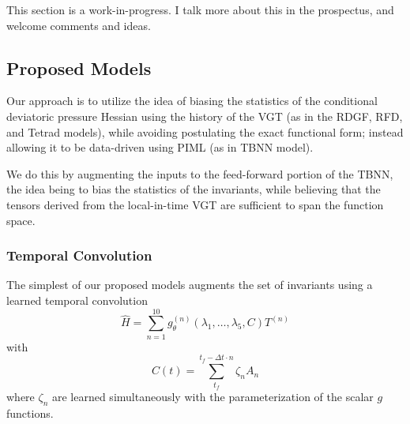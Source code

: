 This section is a work-in-progress. I talk more about this in the prospectus, and welcome comments and ideas.

\subsection{Proposed Models}
Our approach is to utilize the idea of biasing the statistics of the conditional deviatoric pressure Hessian using the history of the VGT (as in the RDGF, RFD, and Tetrad models), while avoiding postulating the exact functional form; instead allowing it to be data-driven using PIML (as in TBNN model).

We do this by augmenting the inputs to the feed-forward portion of the TBNN, the idea being to bias the statistics of the invariants, while believing that the tensors derived from the local-in-time VGT are sufficient to span the function space.

    
    
\subsubsection{Temporal Convolution}
The simplest of our proposed models augments the set of invariants using a learned temporal convolution
\begin{equation} \label{eq:tc_pred}
  \hat{H} = \sum_{n=1}^{10} g_\theta^{(n)}(\lambda_1, \dots, \lambda_5, C)T^{(n)}
\end{equation}
with
\begin{equation}
    C(t) = \sum_{t_f}^{t_f-\Delta t \cdot n} \zeta_n A_n
\end{equation}
where $\zeta_n$ are learned simultaneously with the parameterization of the scalar $g$ functions.


